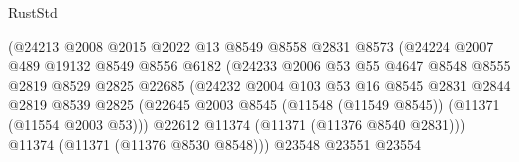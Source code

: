 \begin{lexlean}{RustStd}
\begin{coremodule}
                                      (@24213
                                        @2008
                                        @2015
                                        @2022
                                        @13
                                        @8549
                                        @8558
                                        @2831
                                        @8573
                                        (@24224
                                          @2007
                                          @489
                                          @19132
                                          @8549
                                          @8556
                                          @6182
                                          (@24233
                                            @2006
                                            @53
                                            @55
                                            @4647
                                            @8548
                                            @8555
                                            @2819
                                            @8529
                                            @2825
                                            @22685
                                            (@24232
                                              @2004
                                              @103
                                              @53
                                              @16
                                              @8545
                                              @2831
                                              @2844
                                              @2819
                                              @8539
                                              @2825
                                              (@22645
                                                @2003
                                                @8545
                                                (@11548 (@11549 @8545))
                                                (@11371 (@11554 @2003 @53)))
                                              @22612
                                              @11374
                                              (@11371 (@11376 @8540 @2831)))
                                            @11374
                                            (@11371 (@11376 @8530 @8548)))
                                          @23548
                                          @23551
                                          @23554

\end{coremodule}
\end{lexlean}
